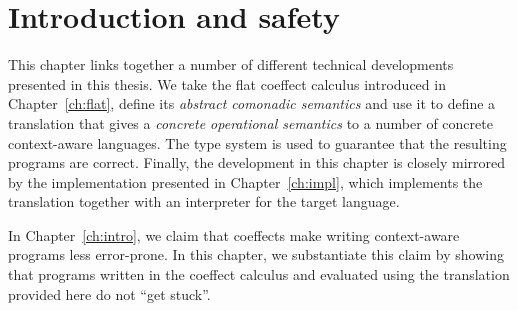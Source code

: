 \section{Introduction and safety}
\label{sec:semantics-intro}

This chapter links together a number of different technical developments presented in this thesis.
We take the flat coeffect calculus introduced in Chapter~\ref{ch:flat}, define its \emph{abstract
comonadic semantics} and use it to define a translation that gives a \emph{concrete operational
semantics} to a number of concrete context-aware languages. The type system is used to guarantee
that the resulting programs are correct. Finally, the development in this chapter is closely
mirrored by the implementation presented in Chapter~\ref{ch:impl}, which implements the
translation together with an interpreter for the target language.

In Chapter~\ref{ch:intro}, we claim that coeffects make writing context-aware programs
less error-prone. In this chapter, we substantiate this claim by showing that programs written 
in the coeffect calculus and evaluated using the translation provided here do not ``get stuck''.

